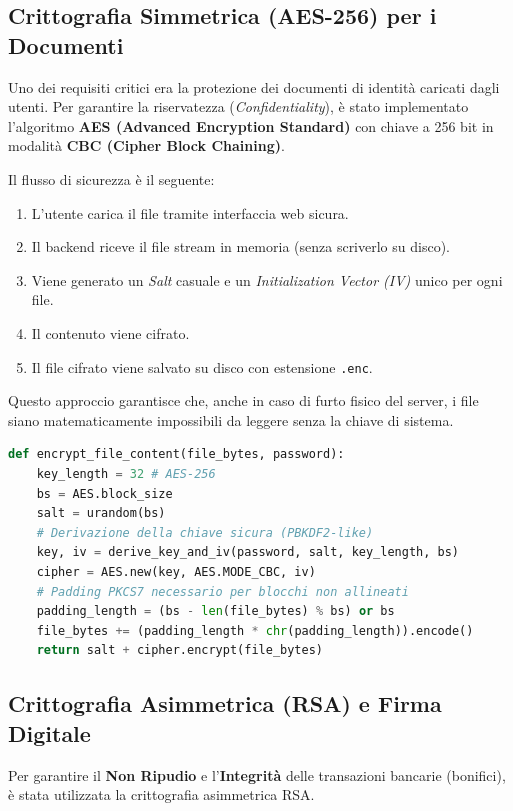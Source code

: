 \documentclass[a4paper, 12pt, titlepage]{article}
\begin{document}
\subsection{Crittografia Simmetrica (AES-256) per i Documenti}
Uno dei requisiti critici era la protezione dei documenti di identità caricati dagli utenti. Per garantire la riservatezza (\textit{Confidentiality}), è stato implementato l'algoritmo \textbf{AES (Advanced Encryption Standard)} con chiave a 256 bit in modalità \textbf{CBC (Cipher Block Chaining)}.

Il flusso di sicurezza è il seguente:
\begin{enumerate}
    \item L'utente carica il file tramite interfaccia web sicura.
    \item Il backend riceve il file stream in memoria (senza scriverlo su disco).
    \item Viene generato un \textit{Salt} casuale e un \textit{Initialization Vector (IV)} unico per ogni file.
    \item Il contenuto viene cifrato.
    \item Il file cifrato viene salvato su disco con estensione \texttt{.enc}.
\end{enumerate}

Questo approccio garantisce che, anche in caso di furto fisico del server, i file siano matematicamente impossibili da leggere senza la chiave di sistema.

\begin{lstlisting}[language=Python, caption={Snippet della funzione di cifratura AES}]
def encrypt_file_content(file_bytes, password):
    key_length = 32 # AES-256
    bs = AES.block_size
    salt = urandom(bs)
    # Derivazione della chiave sicura (PBKDF2-like)
    key, iv = derive_key_and_iv(password, salt, key_length, bs)
    cipher = AES.new(key, AES.MODE_CBC, iv)
    # Padding PKCS7 necessario per blocchi non allineati
    padding_length = (bs - len(file_bytes) % bs) or bs
    file_bytes += (padding_length * chr(padding_length)).encode()
    return salt + cipher.encrypt(file_bytes)
\end{lstlisting}

\subsection{Crittografia Asimmetrica (RSA) e Firma Digitale}
Per garantire il \textbf{Non Ripudio} e l'\textbf{Integrità} delle transazioni bancarie (bonifici), è stata utilizzata la crittografia asimmetrica RSA.
\end{document}
